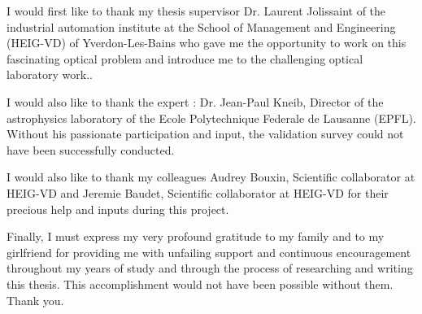 \documentclass[11pt,english,singlespacing,headsepline]{MastersDoctoralThesis} %
\begin{document}

\begin{acknowledgements}
\addchaptertocentry{\acknowledgementname} %
I would first like to thank my thesis supervisor Dr. Laurent Jolissaint of the industrial automation institute at the School of Management and Engineering (HEIG-VD) of Yverdon-Les-Bains who gave me the opportunity to work on this fascinating optical problem and introduce me to the challenging optical laboratory work.. 

I would also like to thank the expert : Dr. Jean-Paul Kneib, Director of the astrophysics laboratory of the Ecole Polytechnique Federale de Lausanne (EPFL). Without his passionate participation and input, the validation survey could not have been successfully conducted.

I would also like to thank my colleagues Audrey Bouxin, Scientific collaborator at HEIG-VD and Jeremie Baudet, Scientific collaborator at HEIG-VD for their precious help and inputs during this project.

Finally, I must express my very profound gratitude to my family and to my girlfriend for providing me with unfailing support and continuous encouragement throughout my years of study and through the process of researching and writing this thesis. This accomplishment would not have been possible without them. Thank you.
\end{acknowledgements}


\tableofcontents %

\listoffigures %


\end{document}
